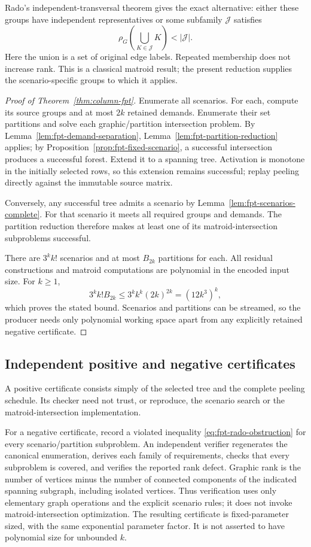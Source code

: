 Rado's independent-transversal theorem gives the exact alternative:
either these groups have independent representatives or some subfamily
$\mathcal J$ satisfies
\[
 \rho_G\left(\bigcup_{K\in\mathcal J}K\right)<|\mathcal J|.
 \tag{$\dagger$}\label{eq:fpt-rado-obstruction}
\]
Here the union is a set of original edge labels. Repeated membership does
not increase rank. This is a classical matroid result; the present
reduction supplies the scenario-specific groups to which it applies.

\begin{proof}[Proof of Theorem~\ref{thm:column-fpt}]
Enumerate all scenarios. For each, compute its source groups and at most
$2k$ retained demands. Enumerate their set partitions and solve each
graphic/partition intersection problem. By
Lemma~\ref{lem:fpt-demand-separation},
Lemma~\ref{lem:fpt-partition-reduction} applies; by
Proposition~\ref{prop:fpt-fixed-scenario}, a successful intersection
produces a successful forest. Extend it to a spanning tree. Activation
is monotone in the initially selected rows, so this extension remains
successful; replay peeling directly against the immutable source matrix.

Conversely, any successful tree admits a scenario by
Lemma~\ref{lem:fpt-scenarios-complete}. For that scenario it meets all
required groups and demands. The partition reduction therefore makes
at least one of its matroid-intersection subproblems successful.

There are $3^k k!$ scenarios and at most $B_{2k}$ partitions for each.
All residual constructions and matroid computations are polynomial in
the encoded input size. For $k\ge1$,
\[
      3^k k!B_{2k}
      \le3^k k^k(2k)^{2k}=(12k^3)^k,
\]
which proves the stated bound. Scenarios and partitions can be streamed,
so the producer needs only polynomial working space apart from any
explicitly retained negative certificate.
\end{proof}

\subsection{Independent positive and negative certificates}

A positive certificate consists simply of the selected tree and the
complete peeling schedule. Its checker need not trust, or reproduce,
the scenario search or the matroid-intersection implementation.

For a negative certificate, record a violated inequality
\eqref{eq:fpt-rado-obstruction} for every scenario/partition subproblem.
An independent verifier regenerates the canonical enumeration, derives
each family of requirements, checks that every subproblem is covered,
and verifies the reported rank defect. Graphic rank is the number of
vertices minus the number of connected components of the indicated
spanning subgraph, including isolated vertices. Thus verification uses
only elementary graph operations and the explicit scenario rules; it
does not invoke matroid-intersection optimization. The resulting
certificate is fixed-parameter sized, with the same exponential
parameter factor. It is not asserted to have polynomial size for
unbounded $k$.


